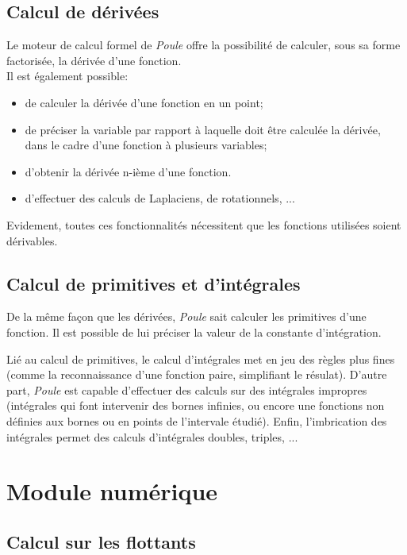 \documentclass[french,12pt]{report}
\begin{document}
\subsection{Calcul de d\'eriv\'ees}

Le moteur de calcul formel  de \emph{ Poule} offre la possibilit\'e de
calculer,   sous   sa  forme   factoris\'ee,   la  d\'eriv\'ee   d'une
fonction. \\Il est \'egalement possible:
\begin {itemize}
\item de calculer la d\'eriv\'ee d'une fonction en un point;
\item de pr\'eciser  la variable par rapport \`a  laquelle doit \^etre
calcul\'ee la d\'eriv\'ee, dans  le cadre d'une fonction \`a plusieurs
variables;
\item d'obtenir la d\'eriv\'ee n-i\`eme d'une fonction.
\item d'effectuer des calculs de Laplaciens, de rotationnels, ...
\end{itemize}


Evidement,   toutes  ces   fonctionnalit\'es  n\'ecessitent   que  les
fonctions utilis\'ees soient d\'erivables.


\subsection{Calcul de primitives et d'int\'egrales}

De  la  m\^eme fa\c{c}on  que  les  d\'eriv\'ees,  \emph{ Poule}  sait
calculer  les  primitives  d'une  fonction.  Il est  possible  de  lui
pr\'eciser la valeur de la constante d'int\'egration.


Li\'e au calcul de primitives, le calcul d'int\'egrales met en jeu des
r\`egles  plus fines  (comme la  reconnaissance d'une  fonction paire,
simplifiant  le r\'esulat).  D'autre part,  \emph{ Poule}  est capable
d'effectuer des  calculs sur des  int\'egrales impropres (int\'egrales
qui font intervenir  des bornes infinies, ou encore  une fonctions non
d\'efinies aux bornes ou en points de l'intervale \'etudi\'e).  Enfin,
l'imbrication  des  int\'egrales  permet  des  calculs  d'int\'egrales
doubles, triples, ...


\section{Module num\'erique}

\subsection{Calcul sur les flottants}
\end{document}
